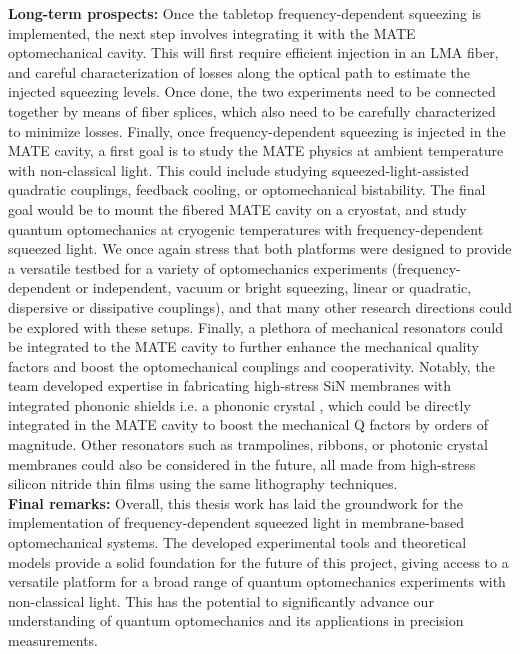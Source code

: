 \noindent \textbf{Long-term prospects:} Once the tabletop frequency-dependent squeezing is implemented, the next step involves integrating it with the MATE optomechanical cavity. This will first require efficient injection in an LMA fiber, and careful characterization of losses along the optical path to estimate the injected squeezing levels. Once done, the two experiments need to be connected together by means of fiber splices, which also need to be carefully characterized to minimize losses. Finally, once frequency-dependent squeezing is injected in the MATE cavity, a first goal is to study the MATE physics at ambient temperature with non-classical light. This could include studying squeezed-light-assisted quadratic couplings, feedback cooling, or optomechanical bistability. The final goal would be to mount the fibered MATE cavity on a cryostat, and study quantum optomechanics at cryogenic temperatures with frequency-dependent squeezed light. We once again stress that both platforms were designed to provide a versatile testbed for a variety of optomechanics experiments (frequency-dependent or independent, vacuum or bright squeezing, linear or quadratic, dispersive or dissipative couplings), and that many other research directions could be explored with these setups. Finally, a plethora of mechanical resonators could be integrated to the MATE cavity to further enhance the mechanical quality factors and boost the optomechanical couplings and cooperativity. Notably, the team developed expertise in fabricating high-stress SiN membranes with integrated phononic shields i.e. a phononic crystal \cite{Ivanov2020}, which could be directly integrated in the MATE cavity to boost the mechanical Q factors by orders of magnitude. Other resonators such as trampolines, ribbons, or photonic crystal membranes could also be considered in the future, all made from high-stress silicon nitride thin films using the same lithography techniques. \\

\noindent \textbf{Final remarks:} Overall, this thesis work has laid the groundwork for the implementation of frequency-dependent squeezed light in membrane-based optomechanical systems. The developed experimental tools and theoretical models provide a solid foundation for the future of this project, giving access to a versatile platform for a broad range of quantum optomechanics experiments with non-classical light. This has the potential to significantly advance our understanding of quantum optomechanics and its applications in precision measurements.\\
